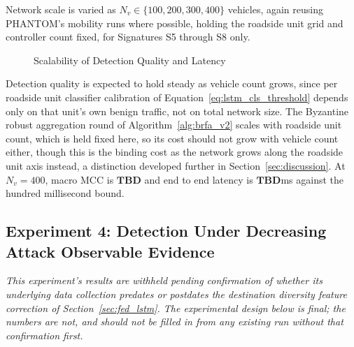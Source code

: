 \documentclass[final,5p,twocolumn]{elsarticle}
\theoremstyle{remark}
\theoremstyle{plain}
\newcommand{\TBD}{\textbf{TBD}} %
\begin{document}
Network scale is varied as $N_v \in \{100,200,300,400\}$ vehicles, again
reusing PHANTOM's mobility runs where possible, holding the roadside unit
grid and controller count fixed, for Signatures S5 through S8 only.
\begin{figure}[!t]
	\centering
	\caption{Scalability of Detection Quality and Latency}
	\label{fig:exp3_scale}
\end{figure}
Detection quality is expected to hold steady as vehicle count grows, since
per roadside unit classifier calibration of
Equation~\eqref{eq:lstm_cls_threshold} depends only on that unit's own
benign traffic, not on total network size. The Byzantine robust aggregation
round of Algorithm~\ref{alg:brfa_v2} scales with roadside unit count, which
is held fixed here, so its cost should not grow with vehicle count either,
though this is the binding cost as the network grows along the roadside
unit axis instead, a distinction developed further in
Section~\ref{sec:discussion}. At $N_v{=}400$, macro MCC is $\TBD$ and end to
end latency is $\TBD$ms against the hundred millisecond bound.

\subsection{Experiment 4: Detection Under Decreasing Attack Observable Evidence}

\textit{This experiment's results are withheld pending confirmation of
whether its underlying data collection predates or postdates the
destination diversity feature correction of
Section~\ref{sec:fed_lstm}. The experimental design below is final; the
numbers are not, and should not be filled in from any existing run without
that confirmation first.}
\end{document}
